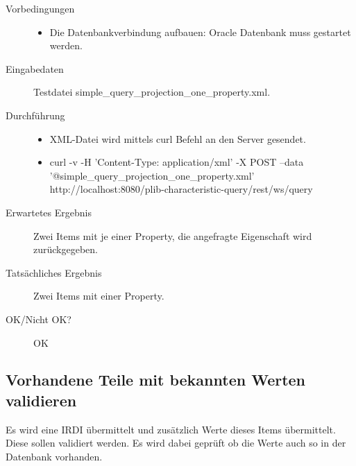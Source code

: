 \begin{description}
\item[Vorbedingungen] 
  \begin{itemize}
   \item Die Datenbankverbindung aufbauen: Oracle Datenbank muss gestartet werden.
  \end{itemize}
\item[Eingabedaten] Testdatei simple\_query\_projection\_one\_property.xml. 
\item[Durchführung]
   \begin{itemize}
   \item XML-Datei wird mittels curl Befehl an den Server gesendet.
   \item curl -v -H 'Content-Type: application/xml' -X POST --data \\
   '@simple\_query\_projection\_one\_property.xml' \\
   http://localhost:8080/plib-characteristic-query/rest/ws/query
  \end{itemize}
\item[Erwartetes Ergebnis] Zwei Items mit je einer Property, die angefragte Eigenschaft wird zurückgegeben. 
\item[Tatsächliches Ergebnis] Zwei Items mit einer Property. 
\item[OK/Nicht OK?] OK
\end{description}


\subsection{Vorhandene Teile mit bekannten Werten validieren}

Es wird eine IRDI übermittelt und zusätzlich Werte dieses Items übermittelt. Diese sollen validiert werden. Es wird dabei geprüft ob die Werte auch so in der Datenbank vorhanden. 

